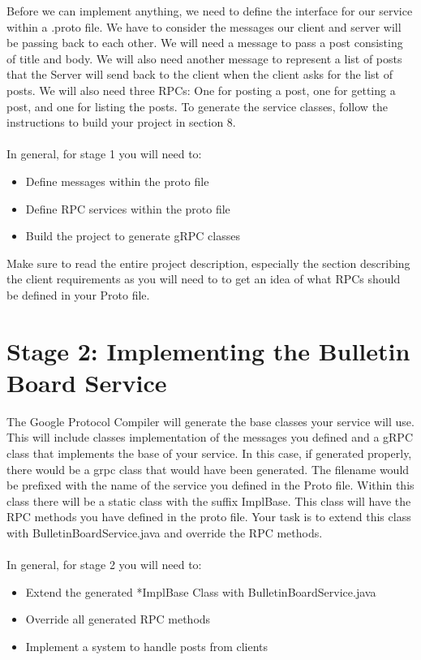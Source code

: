 \documentclass{article}
\begin{document}
Before we can implement anything, we need to define the interface for our service within a .proto file. We have to consider the messages our client and server will be passing back to each other. We will need a message to pass a post consisting of title and body. We will also need another message to represent a list of posts that the Server will send back to the client when the client asks for the list of posts. We will also need three RPCs: One for posting a post, one for getting a post, and one for listing the posts. To generate the service classes, follow the instructions to build your project in section 8.\\\\In general, for stage 1 you will need to:
\begin{itemize}
\item Define messages within the proto file
\item Define RPC services within the proto file
\item Build the project to generate gRPC classes
\end{itemize}
\begin{info}[Note:]
Make sure to read the entire project description, especially the section describing the client requirements as you will need to to get an idea of what RPCs should be defined in your Proto file.
\end{info}



\section{Stage 2: Implementing the Bulletin Board Service} %

The Google Protocol Compiler will generate the base classes your service will use. This will include classes implementation of the messages you defined and a gRPC class that implements the base of your service. In this case, if generated properly, there would be a grpc class that would have been generated. The filename would be prefixed with the name of the service you defined in the Proto file. Within this class there will be a static class with the suffix ImplBase. This class will have the RPC methods you have defined in the proto file. Your task is to extend this class with BulletinBoardService.java and override the RPC methods. \\\\In general, for stage 2 you will need to:
\begin{itemize}
\item Extend the generated *ImplBase Class with BulletinBoardService.java
\item Override all generated RPC methods
\item Implement a system to handle posts from clients
\end{itemize}
\end{document}
